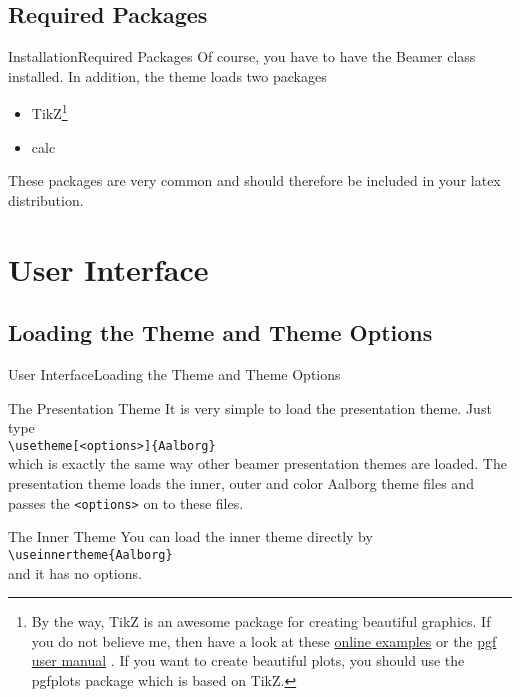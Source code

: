 \documentclass[10pt]{beamer}
\newcommand{\chref}[2]{%
  \href{#1}{{\usebeamercolor[bg]{Aalborg}#2}}
}
\begin{document}
\subsection{Required Packages}
\begin{frame}{Installation}{Required Packages}
  Of course, you have to have the Beamer class installed. In addition, the theme loads two packages
  \begin{itemize}
    \item TikZ\footnote{By the way, TikZ is an awesome package for creating beautiful graphics. If you do not believe me, then have a look at these \chref{http://www.texample.net/tikz/examples/}{online examples} or the \chref{http://tug.ctan.org/tex-archive/graphics/pgf/base/doc/generic/pgf/pgfmanual.pdf}{pgf user manual}. If you want to create beautiful plots, you should use the pgfplots package which is based on TikZ.}
    \item calc
  \end{itemize}
  These packages are very common and should therefore be included in your latex distribution.
\end{frame}

\section{User Interface}
\subsection{Loading the Theme and Theme Options}
\begin{frame}{User Interface}{Loading the Theme and Theme Options}
  \begin{block}{The Presentation Theme}
    It is very simple to load the presentation theme. Just type\\
    {\tt \textbackslash usetheme[<options>]\{Aalborg\}}\\
    which is exactly the same way other beamer presentation themes are loaded. The presentation theme loads the inner, outer and color Aalborg theme files and passes the {\tt <options>} on to these files.
  \end{block}
  \begin{block}{The Inner Theme}
    You can load the inner theme directly by\\
    {\tt \textbackslash useinnertheme\{Aalborg\}}\\
    and it has no options.
  \end{block}
\end{frame}
\end{document}
